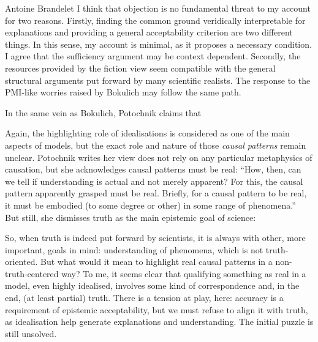 \begin{artengenv}{Antoine Brandelet}
I think that objection is no fundamental threat to my account for two reasons. Firstly, finding the common ground veridically interpretable for explanations and providing a general acceptability criterion are two different things. In this sense, my account is minimal, as it proposes a necessary condition. I agree that the sufficiency argument may be context dependent. Secondly, the resources provided by the fiction view seem compatible with the general structural arguments put forward by many scientific realists. The response to the PMI-like worries raised by Bokulich may follow the same path.

In the same vein as Bokulich, Potochnik claims that


Again, the highlighting role of idealisations is considered as one of the main aspects of models, but the exact role and nature of those \textit{causal patterns} remain unclear. Potochnik writes her view does not rely on any particular metaphysics of causation, but she acknowledges causal patterns must be real: ``How, then, can we tell if understanding is actual and not merely apparent? For this, the causal pattern apparently grasped must be real. Briefly, for a causal pattern to be real, it must be embodied (to some degree or other) in some range of phenomena.''~\parencite[p.115]{Potochnik2017} But still, she dismisses truth as the main epistemic goal of science: 


So, when truth is indeed put forward by scientists, it is always with other, more important, goals in mind: understanding of phenomena, which is not truth-oriented. But what would it mean to highlight real causal patterns in a non-truth-centered way? To me, it seems clear that qualifying something as real in a model, even highly idealised, involves some kind of correspondence and, in the end, (at least partial) truth. There is a tension at play, here: accuracy is a requirement of epistemic acceptability, but we must refuse to align it with truth, as idealisation help generate explanations and understanding. The initial puzzle is still unsolved.


\end{artengenv}
